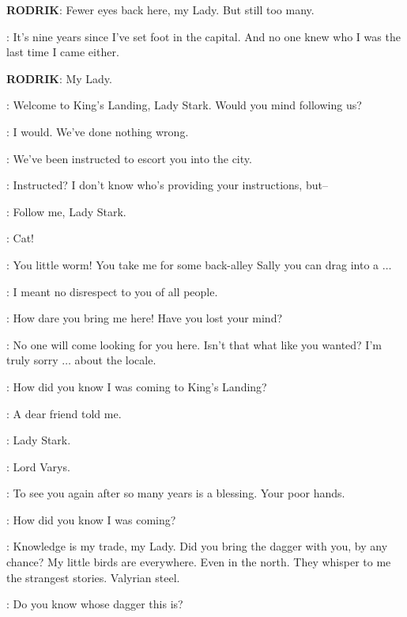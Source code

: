 

\textbf{RODRIK}: Fewer eyes back here, my Lady. But still too many. 

\CATELYN: It's nine years since I've set foot in the capital. And no one knew who I was the last time I came either. 

\textbf{RODRIK}: My Lady. 

\GUARD: Welcome to King's Landing, Lady Stark. Would you mind following us? 

\CATELYN: I would. We've done nothing wrong. 

\GUARD: We've been instructed to escort you into the city. 

\CATELYN: Instructed? I don't know who's providing your instructions, but--

\GUARD: Follow me, Lady Stark. 


\LITTLEFINGER: Cat!  

\CATELYN: You little worm! You take me for some back-alley Sally you can drag into a $\ldots$ 

\LITTLEFINGER: I meant no disrespect to you of all people. 

\CATELYN: How dare you bring me here! Have you lost your mind? 

\LITTLEFINGER: No one will come looking for you here. Isn't that what like you wanted? I'm truly sorry $\ldots$ about the locale. 

\CATELYN: How did you know I was coming to King's Landing? 

\LITTLEFINGER: A dear friend told me. 


\VARYS: Lady Stark. 

\CATELYN: Lord Varys. 

\VARYS: To see you again after so many years is a blessing. Your poor hands. 

\CATELYN: How did you know I was coming? 

\VARYS: Knowledge is my trade, my Lady. Did you bring the dagger with you, by any chance? My little birds are everywhere. Even in the north. They whisper to me the strangest stories. Valyrian steel. 

\CATELYN: Do you know whose dagger this is? 


